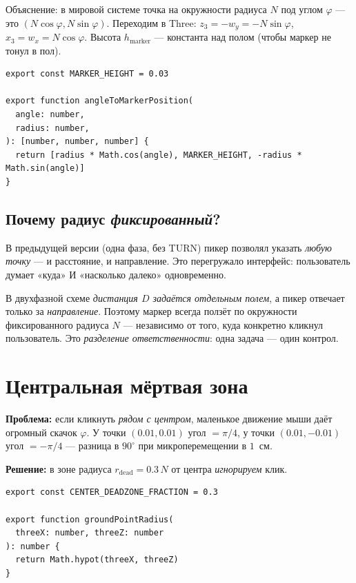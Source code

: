 Объяснение: в мировой системе точка на окружности радиуса $N$ под
углом $\varphi$ --- это $(N\cos\varphi, N\sin\varphi)$. Переходим в
Three: $z_3 = -w_y = -N\sin\varphi$, $x_3 = w_x = N\cos\varphi$.
Высота $h_\text{marker}$ --- константа над полом (чтобы маркер не
тонул в пол).

\begin{codebox}[title={\filepath{lib/targetAngle.ts}}]
\begin{lstlisting}[style=tsstyle]
export const MARKER_HEIGHT = 0.03

export function angleToMarkerPosition(
  angle: number,
  radius: number,
): [number, number, number] {
  return [radius * Math.cos(angle), MARKER_HEIGHT, -radius * Math.sin(angle)]
}
\end{lstlisting}
\end{codebox}

\subsection{Почему радиус \emph{фиксированный}?}

В предыдущей версии (одна фаза, без TURN) пикер позволял указать
\emph{любую точку} --- и расстояние, и направление. Это перегружало
интерфейс: пользователь думает «куда» И «насколько далеко» одновременно.

В двухфазной схеме \emph{дистанция $D$ задаётся отдельным полем},
а пикер отвечает только за \emph{направление}. Поэтому маркер всегда
ползёт по окружности фиксированного радиуса $N$ --- независимо от того,
куда конкретно кликнул пользователь. Это \emph{разделение
ответственности}: одна задача --- один контрол.

\section{Центральная мёртвая зона}

\begin{ideabox}
\textbf{Проблема:} если кликнуть \emph{рядом с центром}, маленькое
движение мыши даёт огромный скачок $\varphi$. У точки $(0.01, 0.01)$
угол $= \pi/4$, у точки $(0.01, -0.01)$ угол $= -\pi/4$ --- разница в
$90^\circ$ при микроперемещении в $1$~см.

\textbf{Решение:} в зоне радиуса $r_\text{dead} = 0.3\,N$ от центра
\emph{игнорируем} клик.
\end{ideabox}

\begin{codebox}[title={\filepath{lib/targetAngle.ts}}]
\begin{lstlisting}[style=tsstyle]
export const CENTER_DEADZONE_FRACTION = 0.3

export function groundPointRadius(
  threeX: number, threeZ: number
): number {
  return Math.hypot(threeX, threeZ)
}
\end{lstlisting}
\end{codebox}

